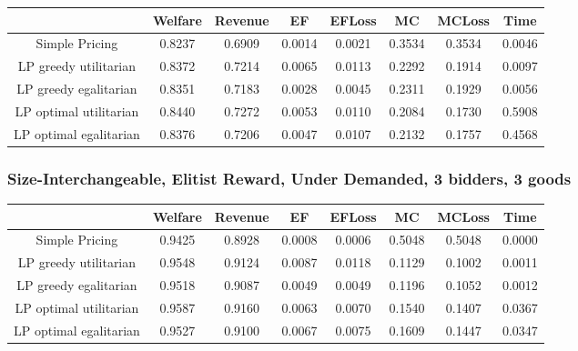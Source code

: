 \begin{tabular}{|c|c|c|c|c|c|c|c|}\hline
                            	&Welfare	&Revenue	&EF	&EFLoss	&MC	&MCLoss	&Time	\\\hline
                Simple Pricing	&0.8237	&0.6909	&0.0014	&0.0021	&0.3534	&0.3534	&0.0046	\\\hline 
         LP greedy utilitarian	&0.8372	&0.7214	&0.0065	&0.0113	&0.2292	&0.1914	&0.0097	\\\hline 
         LP greedy egalitarian	&0.8351	&0.7183	&0.0028	&0.0045	&0.2311	&0.1929	&0.0056	\\\hline 
        LP optimal utilitarian	&0.8440	&0.7272	&0.0053	&0.0110	&0.2084	&0.1730	&0.5908	\\\hline 
        LP optimal egalitarian	&0.8376	&0.7206	&0.0047	&0.0107	&0.2132	&0.1757	&0.4568	\\\hline 
\end{tabular}\subsubsection*{Size-Interchangeable, Elitist Reward, Under Demanded, 3 bidders, 3 goods} 
\begin{tabular}{|c|c|c|c|c|c|c|c|}\hline
                            	&Welfare	&Revenue	&EF	&EFLoss	&MC	&MCLoss	&Time	\\\hline
                Simple Pricing	&0.9425	&0.8928	&0.0008	&0.0006	&0.5048	&0.5048	&0.0000	\\\hline 
         LP greedy utilitarian	&0.9548	&0.9124	&0.0087	&0.0118	&0.1129	&0.1002	&0.0011	\\\hline 
         LP greedy egalitarian	&0.9518	&0.9087	&0.0049	&0.0049	&0.1196	&0.1052	&0.0012	\\\hline 
        LP optimal utilitarian	&0.9587	&0.9160	&0.0063	&0.0070	&0.1540	&0.1407	&0.0367	\\\hline 
        LP optimal egalitarian	&0.9527	&0.9100	&0.0067	&0.0075	&0.1609	&0.1447	&0.0347	\\\hline 
\end{tabular}